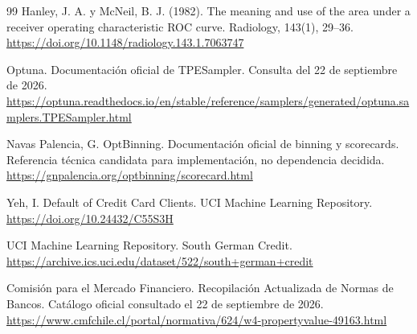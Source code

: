 \documentclass[11pt,letterpaper]{article}
\begin{document}
\begin{thebibliography}{99}
 Hanley, J. A. y McNeil, B. J. (1982). The meaning and use of the area under a receiver operating characteristic ROC curve. Radiology, 143(1), 29--36. \url{https://doi.org/10.1148/radiology.143.1.7063747}

 Optuna. Documentación oficial de TPESampler. Consulta del 22 de septiembre de 2026. \url{https://optuna.readthedocs.io/en/stable/reference/samplers/generated/optuna.samplers.TPESampler.html}

 Navas Palencia, G. OptBinning. Documentación oficial de binning y scorecards. Referencia técnica candidata para implementación, no dependencia decidida. \url{https://gnpalencia.org/optbinning/scorecard.html}

 Yeh, I. Default of Credit Card Clients. UCI Machine Learning Repository. \url{https://doi.org/10.24432/C55S3H}

 UCI Machine Learning Repository. South German Credit. \url{https://archive.ics.uci.edu/dataset/522/south+german+credit}

 Comisión para el Mercado Financiero. Recopilación Actualizada de Normas de Bancos. Catálogo oficial consultado el 22 de septiembre de 2026. \url{https://www.cmfchile.cl/portal/normativa/624/w4-propertyvalue-49163.html}
\end{thebibliography}
\end{document}
